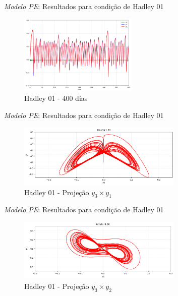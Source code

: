 
\begin{frame}{\textit{Modelo PE}: Resultados para condição de Hadley 01}
	\begin{figure}
		\centering
		\includegraphics[width=0.5\textwidth]{img/p02d260.png}
		\caption{Hadley 01 - 400 dias}
		\label{fig:p02}
	\end{figure}
\end{frame}


\begin{frame}{\textit{Modelo PE}: Resultados para condição de Hadley 01}
	\begin{figure}
		\centering
		\includegraphics[width=0.7\textwidth]{img/p02y3y1.png}
		\caption{Hadley 01 - Projeção $y_3 \times y_1$}
		\label{fig:p02y3y1}
	\end{figure}
\end{frame}


\begin{frame}{\textit{Modelo PE}: Resultados para condição de Hadley 01}
	\begin{figure}
		\centering
		\includegraphics[width=0.7\textwidth]{img/p02y3y2.png}
		\caption{Hadley 01 - Projeção $y_3 \times y_2$}
		\label{fig:p02y3y2}
	\end{figure}
\end{frame}

